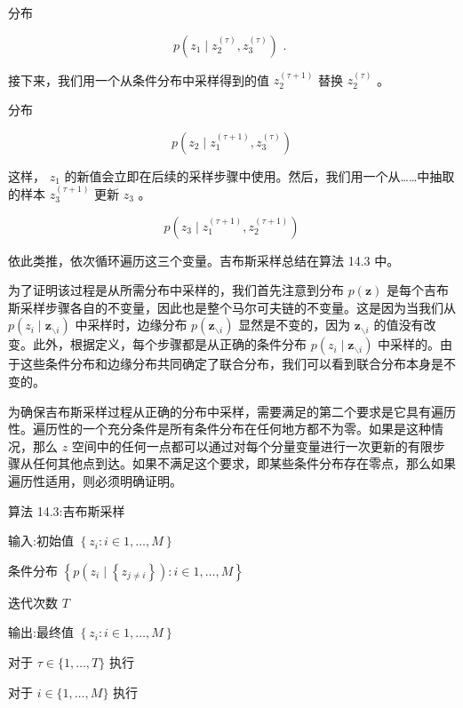 \documentclass[10pt]{report}
\begin{document}
分布

\[
p\left( {{z}_{1} \mid  {z}_{2}^{\left( \tau \right) },{z}_{3}^{\left( \tau \right) }}\right) \text{ . } \tag{14.42}
\]

接下来，我们用一个从条件分布中采样得到的值 \({z}_{2}^{\left( \tau  + 1\right) }\) 替换 \({z}_{2}^{\left( \tau \right) }\) 。

分布

\[
p\left( {{z}_{2} \mid  {z}_{1}^{\left( \tau  + 1\right) },{z}_{3}^{\left( \tau \right) }}\right)  \tag{14.43}
\]

这样， \({z}_{1}\) 的新值会立即在后续的采样步骤中使用。然后，我们用一个从……中抽取的样本 \({z}_{3}^{\left( \tau  + 1\right) }\) 更新 \({z}_{3}\) 。

\[
p\left( {{z}_{3} \mid  {z}_{1}^{\left( \tau  + 1\right) },{z}_{2}^{\left( \tau  + 1\right) }}\right)  \tag{14.44}
\]

依此类推，依次循环遍历这三个变量。吉布斯采样总结在算法 14.3 中。

为了证明该过程是从所需分布中采样的，我们首先注意到分布 \(p\left( \mathbf{z}\right)\) 是每个吉布斯采样步骤各自的不变量，因此也是整个马尔可夫链的不变量。这是因为当我们从 \(p\left( {{z}_{i} \mid  {\mathbf{z}}_{\smallsetminus i}}\right)\) 中采样时，边缘分布 \(p\left( {\mathbf{z}}_{\smallsetminus i}\right)\) 显然是不变的，因为 \({\mathbf{z}}_{\smallsetminus i}\) 的值没有改变。此外，根据定义，每个步骤都是从正确的条件分布 \(p\left( {{z}_{i} \mid  {\mathbf{z}}_{\smallsetminus i}}\right)\) 中采样的。由于这些条件分布和边缘分布共同确定了联合分布，我们可以看到联合分布本身是不变的。

为确保吉布斯采样过程从正确的分布中采样，需要满足的第二个要求是它具有遍历性。遍历性的一个充分条件是所有条件分布在任何地方都不为零。如果是这种情况，那么 \(z\) 空间中的任何一点都可以通过对每个分量变量进行一次更新的有限步骤从任何其他点到达。如果不满足这个要求，即某些条件分布存在零点，那么如果遍历性适用，则必须明确证明。

算法 14.3:吉布斯采样

输入:初始值 \(\left\{  {{z}_{i} : i \in  1,\ldots ,M}\right\}\)

条件分布 \(\left\{  {p\left( {{z}_{i} \mid  \left\{  {z}_{j \neq  i}\right\}  }\right)  : i \in  1,\ldots ,M}\right\}\)

迭代次数 \(T\)

输出:最终值 \(\left\{  {{z}_{i} : i \in  1,\ldots ,M}\right\}\)

对于 \(\tau  \in  \{ 1,\ldots ,T\}\) 执行

对于 \(i \in  \{ 1,\ldots ,M\}\) 执行
\end{document}
